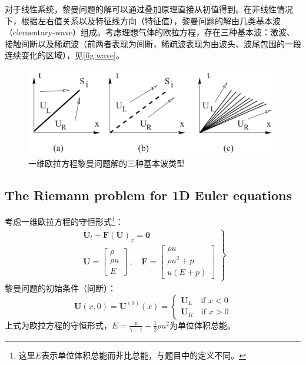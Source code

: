 \documentclass[11pt]{article}
\begin{document}
对于线性系统，黎曼问题的解可以通过叠加原理直接从初值得到。在非线性情况下，根据左右值关系以及特征线方向（特征值），黎曼问题的解由几类基本波（elementary-wave）组成。考虑理想气体的欧拉方程，存在三种基本波：激波、接触间断以及稀疏波（前两者表现为间断，稀疏波表现为由波头、波尾包围的一段连续变化的区域），见\autoref{fig:wave}。


\begin{figure}[htbp]
	\centering
	\includegraphics[width=.8\linewidth]{figure/shocktube/wave.png}
	\caption{\label{fig:wave}一维欧拉方程黎曼问题解的三种基本波类型}
\end{figure}

\subsection{The Riemann problem for 1D Euler equations}
考虑一维欧拉方程的守恒形式\footnote{这里$E$表示单位体积总能而非比总能，与题目中的定义不同。}：
\begin{eqnarray}
	\left.
	\begin{array}{l}
		\bm{U}_t+\bm{F}(\bm{U})_x=\bm{0} \\
		\bm{U}=\left[\begin{matrix}
				\rho   \\
				\rho u \\
				E
			\end{matrix}\right]\ ,\quad
		\bm{F}=\left[\begin{matrix}
				\rho u     \\
				\rho u^2+p \\
				u(E+p)
			\end{matrix}\right]
	\end{array}
	\right\}
\end{eqnarray}
黎曼问题的初始条件（间断）：
\begin{equation}
	\bm{U}(x,0)=\bm{U}^{(0)}(x)=\left\{\begin{array}{l}
		\bm{U}_L\quad \text{if }x<0 \\
		\bm{U}_R\quad \text{if }x>0
	\end{array}\right.
\end{equation}
上式为欧拉方程的守恒形式，$E=\frac{p}{\gamma-1}+\frac{1}{2}\rho u^2$为单位体积总能。
\end{document}

